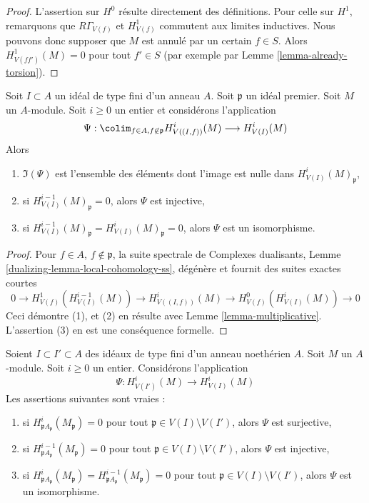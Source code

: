 \begin{proof}
L'assertion sur $H^0$ résulte directement des définitions.
Pour celle sur $H^1$, remarquons que $R\Gamma_{V(f)}$
et $H^1_{V(f)}$ commutent aux limites inductives. Nous pouvons donc supposer
que $M$ est annulé par un certain $f \in S$. Alors
$H^1_{V(ff')}(M) = 0$ pour tout $f' \in S$ (par exemple par
Lemme \ref{lemma-already-torsion}).
\end{proof}

\begin{lemma}
\label{lemma-elements-come-from-bigger}
Soit $I \subset A$ un idéal de type fini d'un anneau $A$.
Soit $\mathfrak p$ un idéal premier. Soit $M$ un $A$-module.
Soit $i \geq 0$ un entier et considérons l'application
$$
\Psi :
\colim_{f \in A, f \not \in \mathfrak p} H^i_{V((I, f))}(M)
\longrightarrow
H^i_{V(I)}(M)
$$
Alors
\begin{enumerate}
\item $\Im(\Psi)$ est l'ensemble des éléments dont l'image est nulle dans
$H^i_{V(I)}(M)_\mathfrak p$,
\item si $H^{i - 1}_{V(I)}(M)_\mathfrak p = 0$, alors $\Psi$ est injective,
\item si $H^{i - 1}_{V(I)}(M)_\mathfrak p = H^i_{V(I)}(M)_\mathfrak p = 0$,
alors $\Psi$ est un isomorphisme.
\end{enumerate}
\end{lemma}

\begin{proof}
Pour $f \in A$, $f \not \in \mathfrak p$, la suite spectrale de
Complexes dualisants, Lemme \ref{dualizing-lemma-local-cohomology-ss},
dégénère et fournit des suites exactes courtes
$$
0 \to H^1_{V(f)}(H^{i - 1}_{V(I)}(M)) \to
H^i_{V((I, f))}(M) \to H^0_{V(f)}(H^i_{V(I)}(M)) \to 0
$$
Ceci démontre (1), et (2) en résulte avec
Lemme \ref{lemma-multiplicative}.
L'assertion (3) en est une conséquence formelle.
\end{proof}

\begin{lemma}
\label{lemma-isomorphism}
Soient $I \subset I' \subset A$ des idéaux de type fini d'un
anneau noethérien $A$. Soit $M$ un $A$-module. Soit $i \geq 0$ un entier.
Considérons l'application
$$
\Psi : H^i_{V(I')}(M) \to H^i_{V(I)}(M)
$$
Les assertions suivantes sont vraies :
\begin{enumerate}
\item si $H^i_{\mathfrak pA_\mathfrak p}(M_\mathfrak p) = 0$
pour tout $\mathfrak p \in V(I) \setminus V(I')$, alors
$\Psi$ est surjective,
\item si $H^{i - 1}_{\mathfrak pA_\mathfrak p}(M_\mathfrak p) = 0$
pour tout $\mathfrak p \in V(I) \setminus V(I')$, alors
$\Psi$ est injective,
\item si $H^i_{\mathfrak pA_\mathfrak p}(M_\mathfrak p) =
H^{i - 1}_{\mathfrak pA_\mathfrak p}(M_\mathfrak p) = 0$
pour tout $\mathfrak p \in V(I) \setminus V(I')$, alors
$\Psi$ est un isomorphisme.
\end{enumerate}
\end{lemma}


